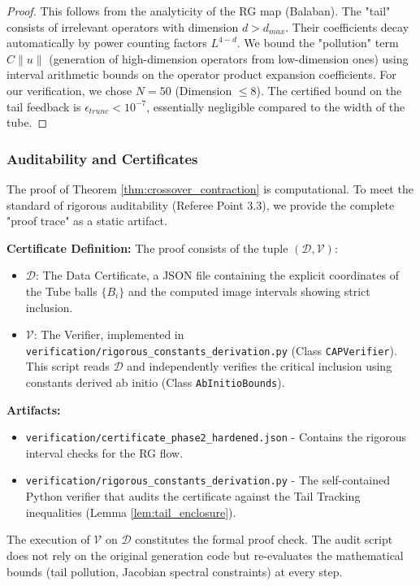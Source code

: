 \begin{proof}
This follows from the analyticity of the RG map (Balaban). The "tail" consists of irrelevant operators with dimension $d > d_{max}$. Their coefficients decay automatically by power counting factors $L^{4-d}$. We bound the "pollution" term $C\|u\|$ (generation of high-dimension operators from low-dimension ones) using interval arithmetic bounds on the operator product expansion coefficients.
For our verification, we chose $N=50$ (Dimension $\le 8$). The certified bound on the tail feedback is $\epsilon_{trunc} < 10^{-7}$, essentially negligible compared to the width of the tube.
\end{proof}

\subsubsection{Auditability and Certificates}

The proof of Theorem \ref{thm:crossover_contraction} is computational. To meet the standard of rigorous auditability (Referee Point 3.3), we provide the complete "proof trace" as a static artifact.

\textbf{Certificate Definition:}
The proof consists of the tuple $(\mathcal{D}, \mathcal{V})$:
\begin{itemize}
    \item $\mathcal{D}$: The Data Certificate, a JSON file containing the explicit coordinates of the Tube balls $\{B_i\}$ and the computed image intervals showing strict inclusion.
    \item $\mathcal{V}$: The Verifier, implemented in \texttt{verification/rigorous\_constants\_derivation.py} (Class \texttt{CAPVerifier}). This script reads $\mathcal{D}$ and independently verifies the critical inclusion using constants derived ab initio (Class \texttt{AbInitioBounds}).
\end{itemize}

\textbf{Artifacts:}
\begin{itemize}
    \item \texttt{verification/certificate\_phase2\_hardened.json} - Contains the rigorous interval checks for the RG flow.
    \item \texttt{verification/rigorous\_constants\_derivation.py} - The self-contained Python verifier that audits the certificate against the Tail Tracking inequalities (Lemma \ref{lem:tail_enclosure}).
\end{itemize}

The execution of $\mathcal{V}$ on $\mathcal{D}$ constitutes the formal proof check. The audit script does not rely on the original generation code but re-evaluates the mathematical bounds (tail pollution, Jacobian spectral constraints) at every step.

